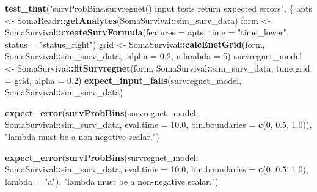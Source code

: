 \documentclass[
]{book}
\newenvironment{Shaded}{\begin{snugshade}}{\end{snugshade}}
\newcommand{\AttributeTok}[1]{\textcolor[rgb]{0.13,0.29,0.53}{#1}}
\newcommand{\DecValTok}[1]{\textcolor[rgb]{0.00,0.00,0.81}{#1}}
\newcommand{\FloatTok}[1]{\textcolor[rgb]{0.00,0.00,0.81}{#1}}
\newcommand{\FunctionTok}[1]{\textcolor[rgb]{0.13,0.29,0.53}{\textbf{#1}}}
\newcommand{\NormalTok}[1]{#1}
\newcommand{\OtherTok}[1]{\textcolor[rgb]{0.56,0.35,0.01}{#1}}
\newcommand{\SpecialCharTok}[1]{\textcolor[rgb]{0.81,0.36,0.00}{\textbf{#1}}}
\newcommand{\StringTok}[1]{\textcolor[rgb]{0.31,0.60,0.02}{#1}}
\begin{document}
\begin{Shaded}
\begin{Highlighting}[]
\FunctionTok{test\_that}\NormalTok{(}\StringTok{"\textasciigrave{}survProbBins.survregnet()\textasciigrave{} input tests return expected errors"}\NormalTok{, \{}
\NormalTok{  apts }\OtherTok{\textless{}{-}}\NormalTok{ SomaReadr}\SpecialCharTok{::}\FunctionTok{getAnalytes}\NormalTok{(SomaSurvival}\SpecialCharTok{::}\NormalTok{sim\_surv\_data)}
\NormalTok{  form }\OtherTok{\textless{}{-}}\NormalTok{ SomaSurvival}\SpecialCharTok{::}\FunctionTok{createSurvFormula}\NormalTok{(}\AttributeTok{features =}\NormalTok{ apts, }
                                          \AttributeTok{time     =} \StringTok{"time\_lower"}\NormalTok{,}
                                          \AttributeTok{status   =} \StringTok{"status\_right"}\NormalTok{)}
\NormalTok{  grid }\OtherTok{\textless{}{-}}\NormalTok{ SomaSurvival}\SpecialCharTok{::}\FunctionTok{calcEnetGrid}\NormalTok{(form, SomaSurvival}\SpecialCharTok{::}\NormalTok{sim\_surv\_data,}
                                     \AttributeTok{.alpha =} \FloatTok{0.2}\NormalTok{, }\AttributeTok{n.lambda =} \DecValTok{5}\NormalTok{)}
\NormalTok{  survregnet\_model }\OtherTok{\textless{}{-}}\NormalTok{ SomaSurvival}\SpecialCharTok{::}\FunctionTok{fitSurvregnet}\NormalTok{(form, SomaSurvival}\SpecialCharTok{::}\NormalTok{sim\_surv\_data,}
                                                  \AttributeTok{tune.grid =}\NormalTok{ grid, }\AttributeTok{alpha =} \FloatTok{0.2}\NormalTok{)}
  \FunctionTok{expect\_input\_fails}\NormalTok{(survregnet\_model, SomaSurvival}\SpecialCharTok{::}\NormalTok{sim\_surv\_data)}
  
  \FunctionTok{expect\_error}\NormalTok{(}\FunctionTok{survProbBins}\NormalTok{(survregnet\_model, SomaSurvival}\SpecialCharTok{::}\NormalTok{sim\_surv\_data,}
                            \AttributeTok{eval.time =} \FloatTok{10.0}\NormalTok{, }\AttributeTok{bin.boundaries =} \FunctionTok{c}\NormalTok{(}\DecValTok{0}\NormalTok{, }\FloatTok{0.5}\NormalTok{, }\FloatTok{1.0}\NormalTok{)),}
               \StringTok{"\textasciigrave{}lambda\textasciigrave{} must be a non{-}negative scalar."}\NormalTok{)}
  
  \FunctionTok{expect\_error}\NormalTok{(}\FunctionTok{survProbBins}\NormalTok{(survregnet\_model, SomaSurvival}\SpecialCharTok{::}\NormalTok{sim\_surv\_data,}
                            \AttributeTok{eval.time =} \FloatTok{10.0}\NormalTok{, }\AttributeTok{bin.boundaries =} \FunctionTok{c}\NormalTok{(}\DecValTok{0}\NormalTok{, }\FloatTok{0.5}\NormalTok{, }\FloatTok{1.0}\NormalTok{),}
                            \AttributeTok{lambda =} \StringTok{"a"}\NormalTok{),}
               \StringTok{"\textasciigrave{}lambda\textasciigrave{} must be a non{-}negative scalar."}\NormalTok{)}
  

\end{Highlighting}
\end{Shaded}
\end{document}

